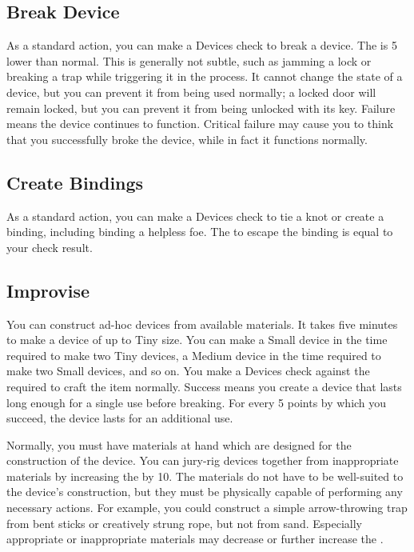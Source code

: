     \subsection{Break Device}
        As a standard action, you can make a Devices check to break a device. The  is 5 lower than normal. This is generally not subtle, such as jamming a lock or breaking a trap while triggering it in the process. It cannot change the state of a device, but you can prevent it from being used normally; a locked door will remain locked, but you can prevent it from being unlocked with its key. Failure means the device continues to function. Critical failure may cause you to think that you successfully broke the device, while in fact it functions normally.

    \subsection{Create Bindings}
        As a standard action, you can make a Devices check to tie a knot or create a binding, including binding a helpless foe. The  to escape the binding is equal to your check result.

    \subsection{Improvise}\label{Improvise}
        You can construct ad-hoc devices from available materials.
        It takes five minutes to make a device of up to Tiny size.
        You can make a Small device in the time required to make two Tiny devices, a Medium device in the time required to make two Small devices, and so on.
        You make a Devices check against the  required to craft the item normally.
        Success means you create a device that lasts long enough for a single use before breaking.
        For every 5 points by which you succeed, the device lasts for an additional use.

        Normally, you must have materials at hand which are designed for the construction of the device.
        You can jury-rig devices together from inappropriate materials by increasing the  by 10.
        The materials do not have to be well-suited to the device's construction, but they must be physically capable of performing any necessary actions.
        For example, you could construct a simple arrow-throwing trap from bent sticks or creatively strung rope, but not from sand.
        Especially appropriate or inappropriate materials may decrease or further increase the .


